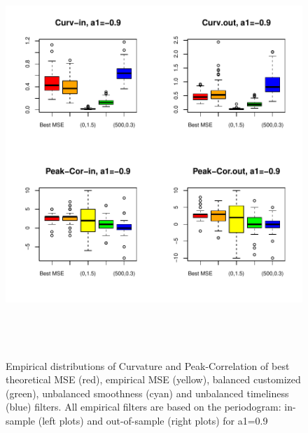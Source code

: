 \documentclass[a4paper]{book}
\begin{document}
\begin{appendix}
\begin{figure}[H]\begin{center}\includegraphics[height=6in, width=6in]{z_box_plot_emp_per_perf_inout_3}\caption{Empirical distributions
  of Curvature and Peak-Correlation of best theoretical MSE (red), empirical MSE (yellow), balanced customized (green),
  unbalanced smoothness (cyan) and unbalanced timeliness (blue) filters. All empirical filters are based on the periodogram:
  in-sample (left plots) and out-of-sample (right plots) for a1=0.9\label{z_box_plot_emp_per_perf_inout_3}}\end{center}\end{figure}



\end{appendix}
\end{document}
